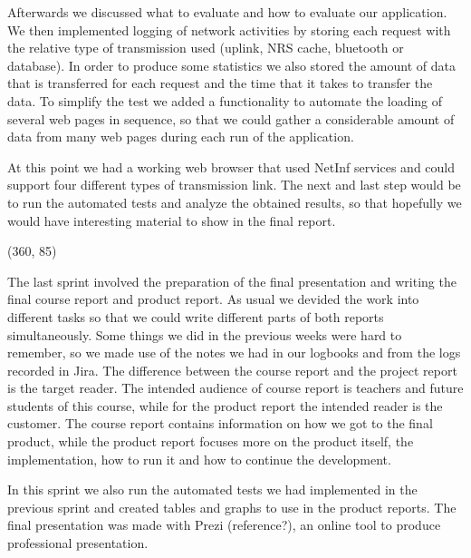 Afterwards we discussed what to evaluate and how to evaluate our application. We then implemented logging of network
activities by storing each request with the relative type of transmission used (uplink, NRS cache, bluetooth or database).
In order to produce some statistics we also stored the amount of data that is transferred for each request and the time that
it takes to transfer the data. To simplify the test we added a functionality to automate the loading of several web pages
in sequence, so that we could gather a considerable amount of data from many web pages during each run of the application.

At this point we had a working web browser that used NetInf services and could support four different types of transmission link.
The next and last step would be to run the automated tests and analyze the obtained results, so that hopefully we would have interesting material
to show in the final report.

\framebox(360, 85){
}

The last sprint involved the preparation of the final presentation and writing the final course report and
product report. As usual we devided the work into different tasks so that we could write different parts
of both reports simultaneously. Some things we did in the previous weeks were hard to remember, so we made
use of the notes we had in our logbooks and from the logs recorded in Jira. The difference between the course report
and the project report is the target reader. The intended audience of course report is teachers and future students
of this course, while for the product report the intended reader is the customer. The course report contains information
on how we got to the final product, while the product report focuses more on the product itself, the implementation,
how to run it and how to continue the development.

In this sprint we also run the automated tests we had implemented in the previous sprint and created tables
and graphs to use in the product reports. The final presentation was made with Prezi (reference?), an online tool
to produce professional presentation.


